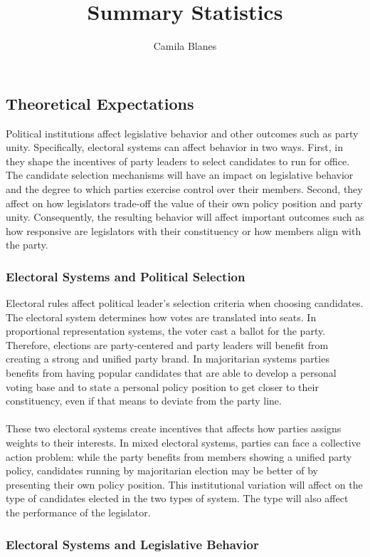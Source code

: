 \documentclass{article}
\title{Summary Statistics}
\author{Camila Blanes}
\date{}
\begin{document}
\subsection*{Theoretical Expectations}

Political institutions affect legislative behavior and other outcomes such as party unity. Specifically, electoral systems can affect behavior in two ways. First, in they shape the  incentives of party leaders to select candidates to run for office. The candidate selection mechanisms will have an impact on legislative behavior and the degree to which parties exercise control over their members. Second, they affect on how legislators trade-off the value of their own policy position and party unity. Consequently, the resulting behavior will affect important outcomes such as how responsive are legislators with their constituency or how members align with the party. 

\subsubsection*{Electoral Systems and Political Selection}
Electoral rules affect political leader's selection criteria when choosing candidates. The electoral system determines how votes are translated into seats. In proportional representation systems, the voter cast a ballot for the party. Therefore, elections are party-centered and party leaders will benefit from creating a strong and unified party brand. In majoritarian systems parties benefits from having popular candidates that are able to develop a personal voting base and to state a personal policy position to get closer to their constituency, even if that means to deviate from the party line. \\
\\ These two electoral systems create incentives that affects how parties assigns weights to their interests. In mixed electoral systems, parties  can face a collective action problem: while the party benefits from members showing a unified party policy, candidates running by majoritarian election may be better of by presenting their own policy position. This institutional variation will affect on the type of candidates elected in the two types of system. The type will also affect the performance of the legislator. 

\subsubsection*{Electoral Systems and Legislative Behavior}
\end{document}

